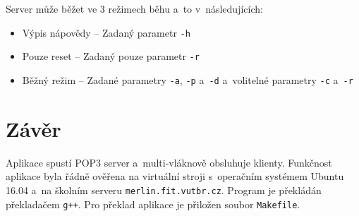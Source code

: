\documentclass[a4paper, 11pt]{article}
\begin{document}
Server může běžet ve 3 režimech běhu a~to v~následujících:
\begin{itemize}
\item Výpis nápovědy -- Zadaný parametr \texttt{-h}
\item Pouze reset -- Zadaný pouze parametr \texttt{-r}
\item Běžný režim -- Zadané parametry \texttt{-a}, \texttt{-p} a~\texttt{-d} a~volitelné parametry \texttt{-c} a~\texttt{-r}
\end{itemize}

\section{Závěr}
Aplikace spustí POP3 server a~multi-vláknově obsluhuje klienty. Funkčnost aplikace byla řádně ověřena na virtuální stroji s~operačním systémem Ubuntu 16.04 a~na školním serveru \texttt{merlin.fit.vutbr.cz}. Program je překládán překladačem \texttt{g++}. Pro překlad aplikace je přiložen soubor \texttt{Makefile}.


\newpage


\end{document}
